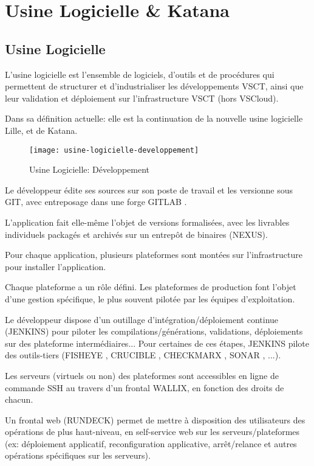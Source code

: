 \section{Usine Logicielle \& Katana}

\subsection{Usine Logicielle}
L'usine logicielle est l'ensemble de logiciels, d'outils et de procédures qui permettent de structurer et d'industrialiser les développements VSCT, ainsi que leur validation et déploiement sur l'infrastructure VSCT (hors VSCloud).

Dans sa définition actuelle: elle est la continuation de la nouvelle usine logicielle Lille, et de Katana.

\begin{figure}[ht]
 \centering
 \texttt{[image: usine-logicielle-developpement]}
 \caption{Usine Logicielle: Développement}
\end{figure}

Le développeur édite ses sources sur son poste de travail et les versionne sous GIT, avec entreposage dans une forge GITLAB .

L'application fait elle-même l'objet de versions formalisées, avec les livrables individuels packagés et archivés sur un entrepôt de binaires (NEXUS).

Pour chaque application, plusieurs plateformes sont montées sur l'infrastructure pour installer l'application.

Chaque plateforme a un rôle défini. Les plateformes de production font l'objet d'une gestion spécifique, le plus souvent pilotée par les équipes d'exploitation.

Le développeur dispose d'un outillage d'intégration/déploiement continue (JENKINS) pour piloter les compilations/générations, validations, déploiements sur des plateforme intermédiaires...
Pour certaines de ces étapes, JENKINS pilote des outils-tiers (FISHEYE , CRUCIBLE , CHECKMARX , SONAR , ...).

Les serveurs (virtuels ou non) des plateformes sont accessibles en ligne de commande SSH au travers d'un frontal WALLIX, en fonction des droits de chacun.

Un frontal web (RUNDECK) permet de mettre à disposition des utilisateurs des opérations de plus haut-niveau, en self-service web sur les serveurs/plateformes (ex: déploiement applicatif, reconfiguration applicative, arrêt/relance et autres opérations spécifiques sur les serveurs).

